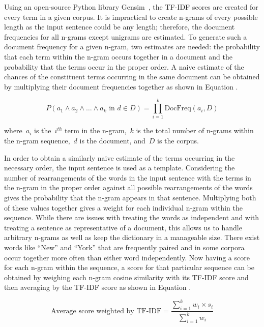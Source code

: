 \documentclass{article}[10]
\begin{document}
Using an open-source Python library Gensim~\cite{gensim}, the TF-IDF scores are
created for every term in a given corpus. It is impractical to create n-grams of
every possible length as the input sentence could be any length; therefore, the
document frequencies for all n-grams except unigrams are estimated. To generate
such a document frequency for a given n-gram, two estimates are needed: the
probability that each term within the n-gram occurs together in a document and
the probability that the terms occur in the proper order. A naive estimate of
the chances of the constituent terms occurring in the same document can be
obtained by multiplying their document frequencies together as shown in Equation
.

\begin{equation}
  P(a_{1} \land a_{2} \land \ldots \land a_{k} \textrm{ in } d \in D) = \prod_{i=1}^{k}\textrm{DocFreq}(a_{i}, D) \label{eq:TF-IDFWeighing}
\end{equation}

where~\(a_{i}\) is the~\(i^{th}\) term in the n-gram,~\(k\) is the total number
of n-grams within the n-gram sequence,~\(d\) is the document, and~\(D\) is the
corpus.

In order to obtain a similarly naive estimate of the terms occurring in the
necessary order, the input sentence is used as a template. Considering the
number of rearrangements of the words in the input sentence with the terms in
the n-gram in the proper order against all possible rearrangements of the words
gives the probability that the n-gram appears in that sentence. Multiplying both
of these values together gives a weight for each individual n-gram within the
sequence. While there are issues with treating the words as independent and with
treating a sentence as representative of a document, this allows us to handle
arbitrary n-grams as well as keep the dictionary in a manageable size. There
exist words like ``New'' and ``York'' that are frequently paired and in some
corpora occur together more often than either word independently. Now having a
score for each n-gram within the sequence, a score for that particular sequence
can be obtained by weighing each n-gram cosine similarity with its TF-IDF score
and then averaging by the TF-IDF score as shown in Equation
.

\begin{equation}
  \textrm{Average score weighted by
    TF-IDF} = \frac{\sum_{i=1}^{k}w_{i}\times s_i}{\sum_{i=1}^{k}w_{i}}\label{eq:averageTF-IDFScore}
\end{equation}
\end{document}
